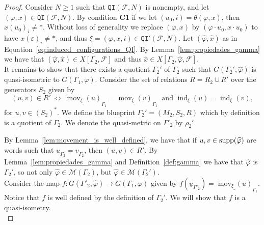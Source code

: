 \documentclass{article}
\theoremstyle{definition}
\theoremstyle{definition}
\newcommand{\Fo}{\mathcal{F}}
\newcommand{\QI}{\mathtt{QI}}
\newcommand{\mov}{\operatorname{mov}}
\newcommand{\ind}{\operatorname{ind}}
\newcommand{\supp}{\textnormal{supp}}
\begin{document}
\begin{proof}

Consider $N\geq 1$ such that $\QI(\Fo,N)$ is nonempty, and let $(\varphi,x)\in \QI(\Fo,N)$. By condition \textbf{C1} if we let $(u_0,i) = \theta(\varphi,x)$, then $x(u_0)_i \neq \ast$. Without loss of generality we replace $(\varphi, x)$ by $(\varphi\cdot u_0, x\cdot u_0)$ to have $x(\varepsilon)_i\neq\ast$, and thus ${\xi}=(\varphi,x,i) \in \QI'(\Fo,N)$. Let $(\widehat{\varphi},\widehat{x})$ as in Equation~\eqref{eq:induced_configurations_QI}. By Lemma~\ref{lem:propiedades_gamma} we have that $(\widehat{\varphi},\widehat{x}) \in X[\Gamma_2, \Fo]$ and thus $\widehat{x}\in X[\Gamma_2, \widehat{\varphi},\Fo]$. \\

It remains to show that there exists a quotient $\Gamma_2'$ of $\Gamma_2$ such that $G(\Gamma_2',\widehat{\varphi})$ is quasi-isometric to $G(\Gamma_1,\varphi)$. Consider the set of relations $R = R_2 \cup R'$ over the generators $S_2$ given by 
$$(u,v)\in R' \ \iff \ \underline{\mov_{\xi}(u)}_{\Gamma_1} = \underline{\mov_{\xi}(v)}_{\Gamma_1} \ \text{ and } \ind_{\xi}(u)=\ind_{\xi}(v),$$
for $u,v\in (S_2)^*$. We define the blueprint $\Gamma_2' = (M_2, S_2, R)$ which by definition is a quotient of $\Gamma_2$. We denote the quasi-metric on $\Gamma'_2$ by $\rho_2'$.

By Lemma~\ref{lem:movement_is_well_defined}, we have that if $u,v\in \supp(\widehat{\varphi})$ are words such that $\underline{u}_{\Gamma_2} = \underline{v}_{\Gamma_2}$, then $(u,v)\in R'$. By Lemma~\ref{lem:propiedades_gamma} and Definition~\ref{def:gamma} we have that $\hat{\varphi}$ is $\Gamma_2'$, so not only $\widehat{\varphi} \in \mathcal{M}(\Gamma_2)$, but  $\widehat{\varphi} \in \mathcal{M}(\Gamma_2')$. \\

Consider the map  $f\colon G(\Gamma'_2,\widehat{\varphi}) \to G(\Gamma_1,\varphi)$ given by $f(\underline{u}_{\Gamma'_2}) = \underline{\mov_{\xi}(u)}_{\Gamma_1}$. Notice that $f$ is well defined by the definition of $\Gamma_2'$. We will show that $f$ is a quasi-isometry.\\


\end{proof}
\end{document}
